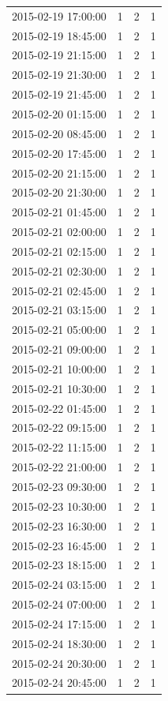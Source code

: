 \begin{tabular}{lrrr}
2015-02-19 17:00:00 & 1 & 2 & 1 \\
2015-02-19 18:45:00 & 1 & 2 & 1 \\
2015-02-19 21:15:00 & 1 & 2 & 1 \\
2015-02-19 21:30:00 & 1 & 2 & 1 \\
2015-02-19 21:45:00 & 1 & 2 & 1 \\
2015-02-20 01:15:00 & 1 & 2 & 1 \\
2015-02-20 08:45:00 & 1 & 2 & 1 \\
2015-02-20 17:45:00 & 1 & 2 & 1 \\
2015-02-20 21:15:00 & 1 & 2 & 1 \\
2015-02-20 21:30:00 & 1 & 2 & 1 \\
2015-02-21 01:45:00 & 1 & 2 & 1 \\
2015-02-21 02:00:00 & 1 & 2 & 1 \\
2015-02-21 02:15:00 & 1 & 2 & 1 \\
2015-02-21 02:30:00 & 1 & 2 & 1 \\
2015-02-21 02:45:00 & 1 & 2 & 1 \\
2015-02-21 03:15:00 & 1 & 2 & 1 \\
2015-02-21 05:00:00 & 1 & 2 & 1 \\
2015-02-21 09:00:00 & 1 & 2 & 1 \\
2015-02-21 10:00:00 & 1 & 2 & 1 \\
2015-02-21 10:30:00 & 1 & 2 & 1 \\
2015-02-22 01:45:00 & 1 & 2 & 1 \\
2015-02-22 09:15:00 & 1 & 2 & 1 \\
2015-02-22 11:15:00 & 1 & 2 & 1 \\
2015-02-22 21:00:00 & 1 & 2 & 1 \\
2015-02-23 09:30:00 & 1 & 2 & 1 \\
2015-02-23 10:30:00 & 1 & 2 & 1 \\
2015-02-23 16:30:00 & 1 & 2 & 1 \\
2015-02-23 16:45:00 & 1 & 2 & 1 \\
2015-02-23 18:15:00 & 1 & 2 & 1 \\
2015-02-24 03:15:00 & 1 & 2 & 1 \\
2015-02-24 07:00:00 & 1 & 2 & 1 \\
2015-02-24 17:15:00 & 1 & 2 & 1 \\
2015-02-24 18:30:00 & 1 & 2 & 1 \\
2015-02-24 20:30:00 & 1 & 2 & 1 \\
2015-02-24 20:45:00 & 1 & 2 & 1 \\

\end{tabular}
